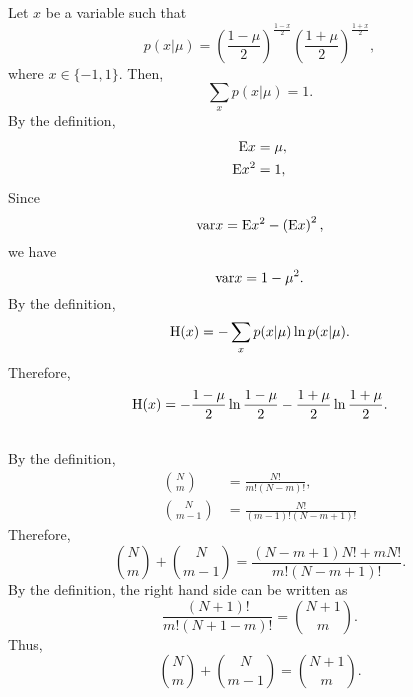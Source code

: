 \subsection{}
\label{2.2}
Let $x$ be a variable such that
%
\begin{equation}
p(x | \mu) = \left( \frac{1 - \mu}{2} \right) ^ \frac{1 - x}{2} \left( \frac{1 + \mu}{2} \right) ^ \frac{1 + x}{2},
\end{equation}
%
where $x \in \{ -1, 1 \}$.
Then,
%
\begin{equation}
\sum_{x} p(x | \mu) = 1.
\end{equation}
%
By the definition,
%
\begin{equation}
\begin{aligned}
{\rm E} x &= \mu, \\
{\rm E} x ^ 2 &= 1,
\end{aligned}
\end{equation}
%
Since
%
\begin{equation}
{\rm var} x = {\rm E} x ^ 2 - \left( {\rm E} x \right) ^ 2,
\end{equation}
%
we have
%
\begin{equation}
{\rm var} x = 1 - \mu ^ 2.
\end{equation}
%
By the definition,
%
\begin{equation}
{\rm H} (x) = - \sum_{x} p(x | \mu) \ln p(x | \mu).
\end{equation}
%
Therefore,
%
\begin{equation}
{\rm H} (x) = - \frac{1 - \mu}{2} \ln \frac{1 - \mu}{2} - \frac{1 + \mu}{2} \ln \frac{1 + \mu}{2}.
\end{equation}
%


\subsection{}
\label{2.3}
By the definition,
%
\begin{equation}
\begin{aligned}
{N \choose m} &= \frac{N!}{m! (N - m)!}, \\
{N \choose m - 1} &= \frac{N!}{(m - 1)! (N - m + 1)!}
\end{aligned}
\end{equation}
%
Therefore,
%
\begin{equation}
{N \choose m} + {N \choose m - 1} = \frac{(N - m + 1) N! + m N!}{m! (N - m + 1)!}.
\end{equation}
%
By the definition, the right hand side can be written as
%
\begin{equation}
\frac{(N + 1)!}{m! (N + 1 - m)!} = {N + 1 \choose m}.
\end{equation}
%
Thus,
%
\begin{equation}
{N \choose m} + {N \choose m - 1} = {N + 1 \choose m}.
\end{equation}
%

